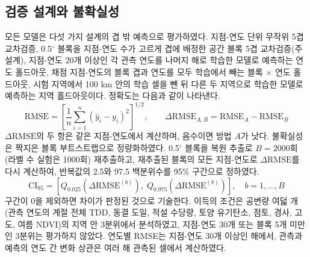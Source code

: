 
\subsection{검증 설계와 불확실성}
모든 모델은 다섯 가지 설계의 겹 밖 예측으로 평가하였다\cite{Roberts2017,Ploton2020}. 지점-연도 단위 무작위 5겹 교차검증, 0.5$^\circ$ 블록을 지점-연도 수가 고르게 겹에 배정한 공간 블록 5겹 교차검증(주 설계), 지점-연도 20개 이상인 각 관측 연도를 나머지 해로 학습한 모델로 예측하는 연도 홀드아웃, 채점 지점-연도의 블록 겹과 연도를 모두 학습에서 빼는 블록 × 연도 홀드아웃, 시험 지역에서 100 km 안의 학습 셀을 뺀 뒤 다른 두 지역으로 학습한 모델로 예측하는 지역 홀드아웃이다. 정확도는 다음과 같이 나타낸다.
\begin{equation}
\mathrm{RMSE} = \left[ \frac{1}{n} \sum_{i=1}^{n} \left( \hat{y}_i - y_i \right)^{2} \right]^{1/2}, \qquad \Delta\mathrm{RMSE}_{A,B} = \mathrm{RMSE}_{A} - \mathrm{RMSE}_{B}
\label{eq:rmse}
\end{equation}
$\Delta\mathrm{RMSE}$의 두 항은 같은 지점-연도에서 계산하며, 음수이면 방법 $A$가 낫다. 불확실성은 짝지은 블록 부트스트랩으로 정량화하였다. 0.5$^\circ$ 블록을 복원 추출로 $B=2000$회(라벨 수 실험은 1000회) 재추출하고, 재추출된 블록의 모든 지점-연도로 $\Delta\mathrm{RMSE}$를 다시 계산하여, 반복값의 2.5와 97.5 백분위수를 95\% 구간으로 정하였다.
\begin{equation}
\mathrm{CI}_{95} = \left[ Q_{0.025}\!\left( \Delta\mathrm{RMSE}^{(b)} \right),\; Q_{0.975}\!\left( \Delta\mathrm{RMSE}^{(b)} \right) \right], \quad b = 1,\ldots,B
\label{eq:ci}
\end{equation}
구간이 0을 제외하면 차이가 판정된 것으로 기술한다. 이득의 조건은 공변량 여덟 개(관측 연도의 계절 전체 TDD, 동결 도일, 적설 수당량, 토양 유기탄소, 점토, 경사, 고도, 여름 NDVI)의 지역 안 3분위에서 분석하였고, 지점-연도 30개 또는 블록 5개 미만인 3분위는 평가하지 않았다. 연도별 RMSE는 지점-연도 30개 이상인 해에서, 관측과 예측의 연도 간 변화 상관은 여러 해 관측된 셀에서 계산하였다.

